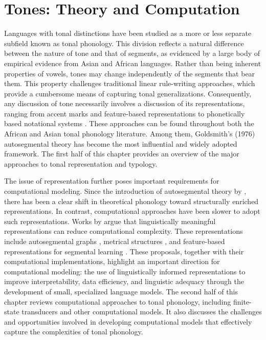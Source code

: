 \chapter{Tones: Theory and Computation} 
\label{chap:tones}

Languages with tonal distinctions have been studied as a more or less separate 
subfield known as tonal phonology. This division reflects a natural difference 
between the nature of tone and that of segments, as evidenced by a large body of 
empirical evidence from Asian and African languages. Rather than being inherent 
properties of vowels, tones may change independently of the segments that bear 
them. This property challenges traditional linear rule-writing approaches, which 
provide a cumbersome means of capturing tonal generalizations. Consequently, any 
discussion of tone necessarily involves a discussion of its representations, 
ranging from accent marks and feature-based representations to phonetically 
based notational systems \citep{chao1930system}. These approaches can be found 
throughout both the African and Asian tonal phonology literature. Among them, 
Goldsmith's (1976) autosegmental theory has become the most influential and widely 
adopted framework. The first half of this chapter provides an overview of the major 
approaches to tonal representation and typology.

The issue of representation further poses important requirements for computational 
modeling. Since the introduction of autosegmental theory by 
\citet{goldsmith1976autosegmental}, there has been a clear shift in theoretical 
phonology toward structurally enriched representations. In contrast, computational 
approaches have been slower to adopt such representations. 
Works by \citet{jardine16dissertation,chandlee2019autosegmental,oakden2020computational} 
argue that linguistically meaningful representations can reduce computational complexity. 
These representations include autosegmental graphs \citep{jardine16dissertation}, 
metrical structures , and feature-based representations for segmental 
learning . These proposals, together with their computational 
implementations, highlight an important direction for computational modeling: 
the use of linguistically informed representations to improve interpretability, 
data efficiency, and linguistic adequacy through the development of small, 
specialized language models. The second half of this chapter reviews 
computational approaches to tonal phonology, including finite-state transducers 
and other computational models. It also discusses the challenges and 
opportunities involved in developing computational models that effectively 
capture the complexities of tonal phonology.

